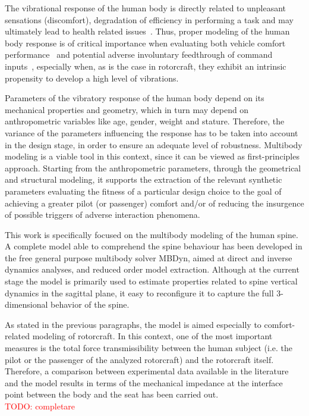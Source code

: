 The vibrational response of the human body is directly related to unpleasant sensations
(discomfort), degradation of efficiency in performing a task and may ultimately lead to
health related issues~\cite{griffin-1996-hbhv,garg-1976-ie3tsmc,hill-2009-jb}.
Thus, proper modeling of the human body response is of critical importance when evaluating
both vehicle comfort performance~\cite{deoliveira-2005-asem} and potential adverse
involuntary feedthrough of command inputs~\cite{quaranta-2013-jsv}, especially when,
as is the case in rotorcraft, they exhibit an intrinsic propensity to develop a high level
of vibrations.

Parameters of the vibratory response of the human body depend on its mechanical properties
and geometry, which in turn may depend on anthropometric
variables like age, gender, weight and stature. Therefore, the variance of the parameters
influencing the response has to be taken into account in the design stage, in order to
ensure an adequate level of robustness. Multibody modeling is a viable tool in this
context, since it can be viewed as first-principles approach. Starting from the
anthropometric parameters, through the geometrical and structural modeling, it supports the
extraction of the relevant synthetic parameters evaluating the fitness of a particular
design choice to the goal of achieving a greater pilot (or passenger) comfort
and/or of reducing the insurgence of possible triggers of adverse interaction
phenomena. 

This work is specifically focused on the multibody modeling of the human spine. A complete
model able to comprehend the spine behaviour has been developed in the
free general purpose multibody solver MBDyn, aimed at direct and inverse dynamics analyses,
and reduced order model extraction. Although at the current stage the model is
primarily used to estimate properties related to spine vertical dynamics in the
sagittal plane, it easy to reconfigure it to capture the full 3-dimensional
behavior of the spine.

As stated in the previous paragraphs, the model is aimed especially to
comfort-related modeling of rotorcraft. In this context, one of the most
important measures is the total force transmissibility between the human subject
(i.e. the pilot or the passenger of the analyzed rotorcraft) and the rotorcraft
itself. Therefore, a comparison between experimental data available in the
literature and the model results in terms of the mechanical impedance at the
interface point between the body and the seat has been carried out. \\
\textcolor{red}{TODO: completare}
